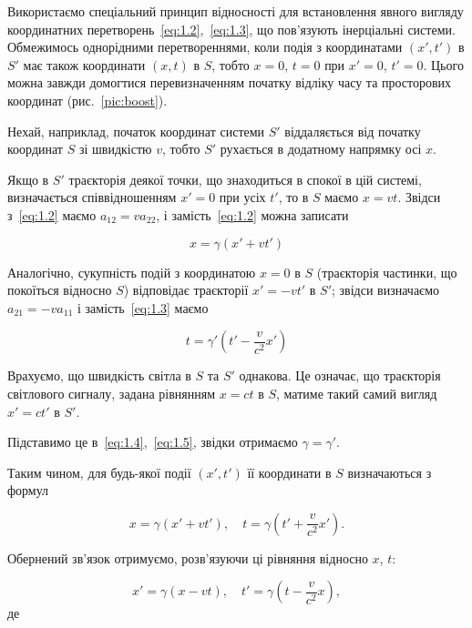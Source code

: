 Використаємо спеціальний принцип відносності для встановлення явного вигляду координатних перетворень~\eqref{eq:1.2},~\eqref{eq:1.3}, що пов'язують інерціальні системи. Обмежимось однорідними перетвореннями, коли подія з координатами $(x', t')$ в $S'$ має також координати $(x, t)$ в $S$, тобто $x=0$, $t=0$ при $x'=0$, $t'=0$. Цього можна завжди домогтися перевизначенням початку відліку часу та просторових координат (рис.~\ref{pic:boost}).

Нехай, наприклад, початок координат системи $S'$ віддаляється від початку координат $S$ зі швидкістю $v$, тобто $S'$ рухається в додатному напрямку осі $x$.

Якщо в $S'$ траєкторія деякої точки, що знаходиться в спокої в цій системі, визначається співвідношенням $x' = 0$ при усіх $t'$, то в $S$ маємо $x = vt$. Звідси з~\eqref{eq:1.2} маємо $a_{12} = v a_{22}$, і замість~\eqref{eq:1.2} можна записати

\begin{equation}
x = \gamma (x' + v t')
\label{eq:1.4}
\end{equation}

Аналогічно, сукупність подій з координатою $x = 0$ в $S$ (траєкторія частинки, що покоїться відносно $S$) відповідає траєкторії $x' = -v t'$ в $S'$; звідси визначаємо $a_{21} = -v a_{11}$ і замість~\eqref{eq:1.3} маємо

\begin{equation}
t = \gamma' \left(t' - \frac{v}{c^2} x'\right)
\label{eq:1.5}
\end{equation}

Врахуємо, що швидкість світла в $S$ та $S'$ однакова. Це означає, що траєкторія світлового сигналу, задана рівнянням $x = c t$ в $S$, матиме такий самий вигляд $x' = c t'$ в $S'$.

Підставимо це в~\eqref{eq:1.4},~\eqref{eq:1.5}, звідки отримаємо $\gamma = \gamma'$.

Таким чином, для будь-якої події $(x', t')$ її координати в $S$ визначаються з формул

\begin{equation}
x = \gamma (x' + v t'), \quad t = \gamma \left(t' + \frac{v}{c^2} x'\right).
\label{eq:1.6}
\end{equation}

Обернений зв'язок отримуємо, розв'язуючи ці рівняння відносно $x$, $t$:

\begin{equation}
x' = \gamma (x - v t), \quad t' = \gamma \left(t - \frac{v}{c^2} x\right),
\label{eq:1.7}
\end{equation}
де

